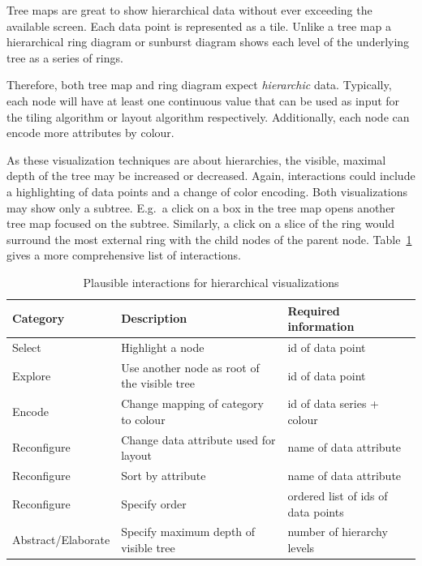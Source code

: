 Tree maps are great to show hierarchical data without ever exceeding the available screen.
Each data point is represented as a tile.
Unlike a tree map a hierarchical ring diagram or sunburst diagram shows each level of the underlying tree as a series of rings.

Therefore, both tree map and ring diagram expect \emph{hierarchic} data.
Typically, each node will have at least one continuous value that can be used as input for the tiling algorithm or layout algorithm respectively.
Additionally, each node can encode more attributes by colour.

As these visualization techniques are about hierarchies, the visible, maximal depth of the tree may be increased or decreased.
Again, interactions could include a highlighting of data points and a change of color encoding.
Both visualizations may show only a subtree.
E.g.\ a click on a box in the tree map opens another tree map focused on the subtree.
Similarly, a click on a slice of the ring would surround the most external ring with the child nodes of the parent node.
Table~\ref{tab:analysis:hierarchies:interactions} gives a more comprehensive list of interactions.


\begin{table}[H]
  \begin{tabular*}{\textwidth}{lll}
    \bf Category & \bf Description & \bf Required information \\
    \hline
    Select & Highlight a node & id of data point \\
    Explore & Use another node as root of the visible tree & id of data point \\
    Encode & Change mapping of category to colour & id of data series + colour \\
    Reconfigure & Change data attribute used for layout & name of data attribute \\
    Reconfigure & Sort by attribute & name of data attribute \\
    Reconfigure & Specify order & ordered list of ids of data points \\
    Abstract/Elaborate & Specify maximum depth of visible tree & number of hierarchy levels \\
  \end{tabular*}
  \caption{Plausible interactions for hierarchical visualizations}%
  \label{tab:analysis:hierarchies:interactions}
\end{table}

